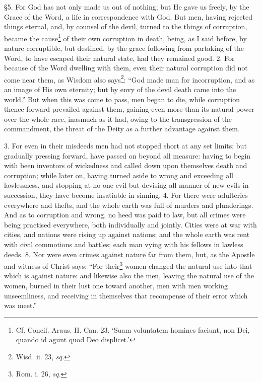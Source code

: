 
§5. For God has not only made us out of nothing; but He gave us freely, by the Grace of the Word, a life in correspondence with God. But men, having rejected things eternal, and, by counsel of the devil, turned to the things of corruption, became the cause\footnote{Cf. Concil. Araus. II. Can. 23. ‘Suam voluntatem homines faciunt, non Dei, quando id agunt quod Deo displicet.’} of their own corruption in death, being, as I said before, by nature corruptible, but destined, by the grace following from partaking of the Word, to have escaped their natural state, had they remained good. 2. For because of the Word dwelling with them, even their natural corruption did not come near them, as Wisdom also says\footnote{Wisd. ii. 23, \emph{sq.}}: “God made man for incorruption, and as an image of His own eternity; but by envy of the devil death came into the world.” But when this was come to pass, men began to die, while corruption thence-forward prevailed against them, gaining even more than its natural power over the whole race, inasmuch as it had, owing to the transgression of the commandment, the threat of the Deity as a further advantage against them.

3. For even in their misdeeds men had not stopped short at any set limits; but gradually pressing forward, have passed on beyond all measure: having to begin with been inventors of wickedness and called down upon themselves death and corruption; while later on, having turned aside to wrong and exceeding all lawlessness, and stopping at no one evil but devising all manner of new evils in succession, they have become insatiable in sinning. 4. For there were adulteries everywhere and thefts, and the whole earth was full of murders and plunderings. And as to corruption and wrong, no heed was paid to law, but all crimes were being practised everywhere, both individually and jointly. Cities were at war with cities, and nations were rising up against nations; and the whole earth was rent with civil commotions and battles; each man vying with his fellows in lawless deeds. 8. Nor were even crimes against nature far from them, but, as the Apostle and witness of Christ says: “For their\footnote{Rom. i. 26, \emph{sq.}} women changed the natural use into that which is against nature: and likewise also the men, leaving the natural use of the women, burned in their lust one toward another, men with men working unseemliness, and receiving in themselves that recompense of their error which was meet.”

